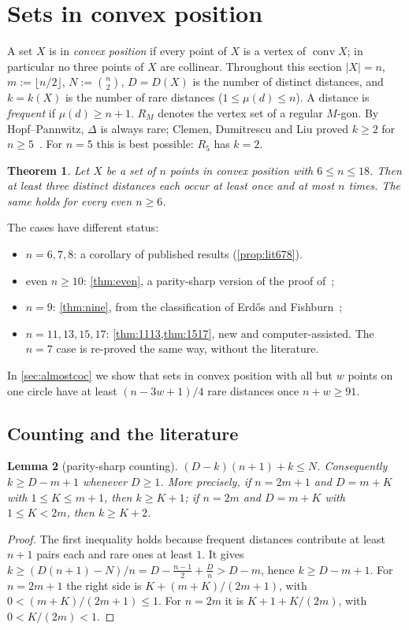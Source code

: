 \documentclass[11pt]{amsart}
\newtheorem{theorem}{Theorem}[section]
\newtheorem{lemma}[theorem]{Lemma}
\theoremstyle{definition}
\theoremstyle{remark}
\newcommand{\mult}{\mu}
\newcommand{\conv}{\operatorname{conv}}
\begin{document}
\section{Sets in convex position}\label{sec:convex}

A set $X$ is in \emph{convex position} if every point of $X$ is a vertex of $\conv X$; in particular no three points of $X$ are collinear. Throughout this section $|X|=n$, $m:=\lfloor n/2\rfloor$, $N:=\binom n2$, $D=D(X)$ is the number of distinct distances, and $k=k(X)$ is the number of rare distances ($1\le\mult(d)\le n$). A distance is \emph{frequent} if $\mult(d)\ge n+1$. $R_M$ denotes the vertex set of a regular $M$-gon. By Hopf--Pannwitz, $\Delta$ is always rare; Clemen, Dumitrescu and Liu proved $k\ge2$ for $n\ge5$~\cite[Theorem~1.2]{CDL25}. For $n=5$ this is best possible: $R_5$ has $k=2$.

\begin{theorem}\label{thm:convex-summary}
Let $X$ be a set of $n$ points in convex position with $6\le n\le18$. Then at least three distinct distances each occur at least once and at most $n$ times. The same holds for every even $n\ge6$.
\end{theorem}

The cases have different status:
\begin{itemize}[leftmargin=2em]
\item $n=6,7,8$: a corollary of published results (\cref{prop:lit678}).
\item even $n\ge10$: \cref{thm:even}, a parity-sharp version of the proof of~\cite[Theorem~1.2]{CDL25};
\item $n=9$: \cref{thm:nine}, from the classification of Erd\H{o}s and Fishburn~\cite{EF96};
\item $n=11,13,15,17$: \cref{thm:1113,thm:1517}, new and computer-assisted. The $n=7$ case is re-proved the same way, without the literature.
\end{itemize}
In \cref{sec:almostcoc} we show that sets in convex position with all but $w$ points on one circle have at least $(n-3w+1)/4$ rare distances once $n+w\ge91$.

\subsection{Counting and the literature}

\begin{lemma}[parity-sharp counting]\label{lem:counting}
$(D-k)(n+1)+k\le N$. Consequently $k\ge D-m+1$ whenever $D\ge1$. More precisely, if $n=2m+1$ and $D=m+K$ with $1\le K\le m+1$, then $k\ge K+1$; if $n=2m$ and $D=m+K$ with $1\le K<2m$, then $k\ge K+2$.
\end{lemma}
\begin{proof}
The first inequality holds because frequent distances contribute at least $n+1$ pairs each and rare ones at least $1$. It gives $k\ge(D(n+1)-N)/n=D-\frac{n-1}2+\frac Dn>D-m$, hence $k\ge D-m+1$. For $n=2m+1$ the right side is $K+(m+K)/(2m+1)$, with $0<(m+K)/(2m+1)\le1$. For $n=2m$ it is $K+1+K/(2m)$, with $0<K/(2m)<1$.
\end{proof}
\end{document}
